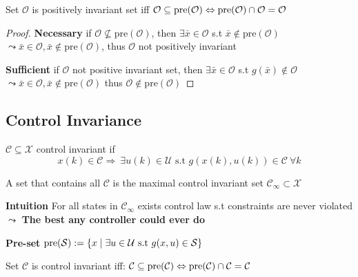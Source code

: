 \begin{theorem}
  Set $\mathcal{O}$ is positively invariant set iff
  $\mathcal{O}\subseteq\operatorname{pre}(\mathcal{O})
  \Leftrightarrow
  \operatorname{pre}(\mathcal{O})\cap\mathcal{O} = \mathcal{O}$
\end{theorem}
\begin{proof}
  \textbf{Necessary} if
  $\mathcal{O} \nsubseteq  \mathrm{pre}(\mathcal{O})$,
  then $\exists\bar{x} \in \mathcal{O}$
  s.t $\bar{x} \notin \mathrm{pre}(\mathcal{O})$
  $\leadsto \bar{x}\in\mathcal{O},
  \bar{x}\notin\mathrm{pre}(\mathcal{O})$,
  thus $\mathcal{O}$ not positively invariant

  \textbf{Sufficient} if
  $\mathcal{O}$ not positive invariant set,
  then $\exists \bar{x}\in\mathcal{O}$
  s.t $g(\bar{x}) \notin\mathcal{O}$
  $\leadsto \bar{x}\in\mathcal{O},
  \bar{x}\notin\mathrm{pre}(\mathcal{O})$
  thus $\mathcal{O}\notin \mathrm{pre}(\mathcal{O})$
\end{proof}


\subsection{Control Invariance}

\begin{definition}
  $\mathcal{C} \subseteq \mathcal{X}$ control invariant if
  $$x(k) \in \mathcal{C} \Rightarrow
  \ \exists u(k) \in \mathcal{U} \text{ s.t }
  g(x(k),u(k))\in\mathcal{C} \ \forall k$$
\end{definition}

\begin{definition}
  A set that contains all $\mathcal{C}$
  is the maximal control invariant set
  $\mathcal{C}_\infty \subset \mathcal{X}$

  \textbf{Intuition} For all states in $\mathcal{C}_\infty$
  exists control law s.t constraints are never violated
  $\leadsto$ \textbf{The best any controller could ever do}
\end{definition}

\textbf{Pre-set}
$\operatorname{pre}(\mathcal{S}):=\{x \mid \exists u\in\mathcal{U}
\text{ s.t } g(x,u) \in \mathcal{S}\}$

Set $\mathcal{C}$ is control invariant iff:
$\mathcal{C}\subseteq\operatorname{pre}(\mathcal{C})
\Leftrightarrow
\operatorname{pre}(\mathcal{C})\cap\mathcal{C} = \mathcal{C}$

